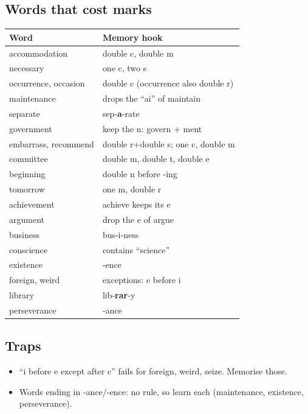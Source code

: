 \documentclass[11pt,a4paper]{article}
\begin{document}
\subsection*{Words that cost marks}
\begin{center}\small\renewcommand{\arraystretch}{1.2}
\begin{tabularx}{\linewidth}{@{}>{\raggedright\arraybackslash}p{3.6cm} >{\raggedright\arraybackslash}X@{}}
\toprule
\textbf{Word} & \textbf{Memory hook}\\
\midrule
accommodation & double c, double m\\
necessary & one c, two s\\
occurrence, occasion & double c (occurrence also double r)\\
maintenance & drops the ``ai'' of maintain\\
separate & sep-\textbf{a}-rate\\
government & keep the n: govern + ment\\
embarrass, recommend & double r+double s; one c, double m\\
committee & double m, double t, double e\\
beginning & double n before -ing\\
tomorrow & one m, double r\\
achievement & achieve keeps its e\\
argument & drop the e of argue\\
business & bus-i-ness\\
conscience & contains ``science''\\
existence & -ence\\
foreign, weird & exceptions: e before i\\
library & lib-\textbf{rar}-y\\
perseverance & -ance\\
\bottomrule
\end{tabularx}
\end{center}
\subsection*{Traps}
\begin{itemize}
\item ``i before e except after c'' fails for foreign, weird, seize. Memorise those.
\item Words ending in -ance/-ence: no rule, so learn each (maintenance, existence, perseverance).
\end{itemize}
\end{document}
